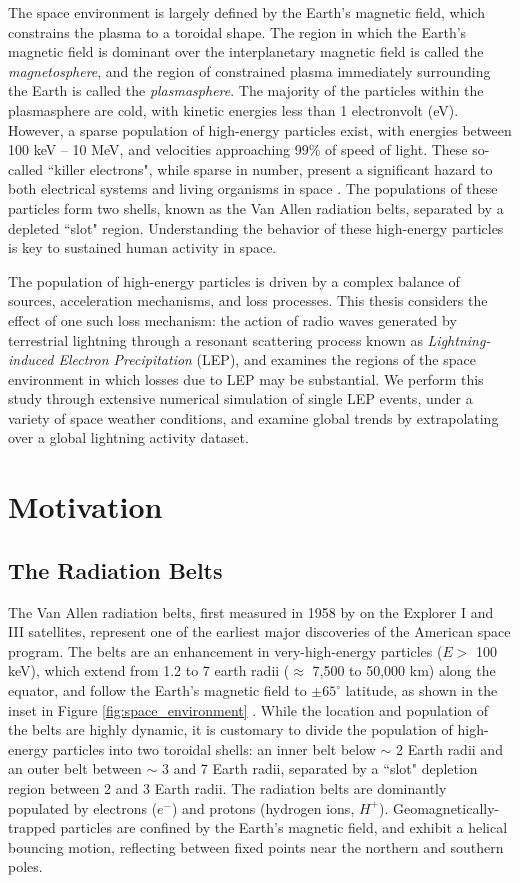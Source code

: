 The space environment is largely defined by the Earth's magnetic field, which constrains the plasma to a toroidal shape. The region in which the Earth's magnetic field is dominant over the interplanetary magnetic field is called the \emph{magnetosphere}, and the region of constrained plasma immediately surrounding the Earth is called the \emph{plasmasphere}. The majority of the particles within the plasmasphere are cold, with kinetic energies less than 1 electronvolt (eV). However, a sparse population of high-energy particles exist, with energies between 100 keV -- 10 MeV, and velocities approaching 99\% of speed of light. These so-called ``killer electrons", while sparse in number, present a significant hazard to both electrical systems and living organisms in space \citep{Barth2003}. The populations of these particles form two shells, known as the Van Allen radiation belts, separated by a depleted ``slot" region. Understanding the behavior of these high-energy particles is key to sustained human activity in space. 

The population of high-energy particles is driven by a complex balance of sources, acceleration mechanisms, and loss processes. This thesis considers the effect of one such loss mechanism: the action of radio waves generated by terrestrial lightning through a resonant scattering process known as \emph{Lightning-induced Electron Precipitation} (LEP), and examines the regions of the space environment in which losses due to LEP may be substantial. We perform this study through extensive numerical simulation of single LEP events, under a variety of space weather conditions, and examine global trends by extrapolating over a global lightning activity dataset.



\section{Motivation}
\subsection{The Radiation Belts}
The Van Allen radiation belts, first measured in 1958 by \cite{VanAllen1958} on the Explorer I and III satellites, represent one of the earliest major discoveries of the American space program. The belts are an enhancement in very-high-energy particles ($E >$ 100 keV), which extend from 1.2 to 7 earth radii ($\approx$ 7,500 to 50,000 km) along the equator, and follow the Earth's magnetic field to $\pm65^\circ$ latitude, as shown in the inset in Figure \ref{fig:space_environment} \citep{Walt1994}. While the location and population of the belts are highly dynamic, it is customary to divide the population of high-energy particles into two toroidal shells: an inner belt below $\sim$ 2 Earth radii and an outer belt between $\sim$ 3 and 7 Earth radii, separated by a ``slot" depletion region between 2 and 3 Earth radii. The radiation belts are dominantly populated by electrons ($e^-$) and protons (hydrogen ions, $H^+$). Geomagnetically-trapped particles are confined by the Earth's magnetic field, and exhibit a helical bouncing motion, reflecting between fixed points near the northern and southern poles.

